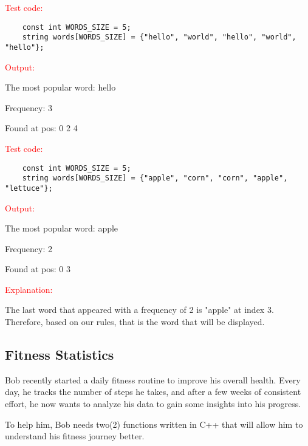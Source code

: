 \begin{sample}
    \textcolor{red}{Test code:}
    \begin{verbatim}
    const int WORDS_SIZE = 5;
    string words[WORDS_SIZE] = {"hello", "world", "hello", "world", "hello"};

\end{verbatim}
\textcolor{red}{Output:}

The most popular word: hello

Frequency: 3

Found at pos: 0 2 4

\end{sample}

\begin{sample}
\textcolor{red}{Test code:}
    \begin{verbatim}
    const int WORDS_SIZE = 5;
    string words[WORDS_SIZE] = {"apple", "corn", "corn", "apple", "lettuce"};

\end{verbatim}
\textcolor{red}{Output:}

The most popular word: apple

Frequency: 2

Found at pos: 0 3


\textcolor{red}{Explanation:}

The last word that appeared with a frequency of 2 is "apple" at index 3. Therefore, based on our rules, that is the word that will be displayed. 
\end{sample}


\subsection{Fitness Statistics}

Bob recently started a daily fitness routine to improve his overall health. Every day, he tracks the number of steps he takes, and after a few weeks of consistent effort, he now wants to analyze his data to gain some insights into his progress. 

To help him, Bob needs two(2) functions written in C++ that will allow him to understand his fitness journey better.

